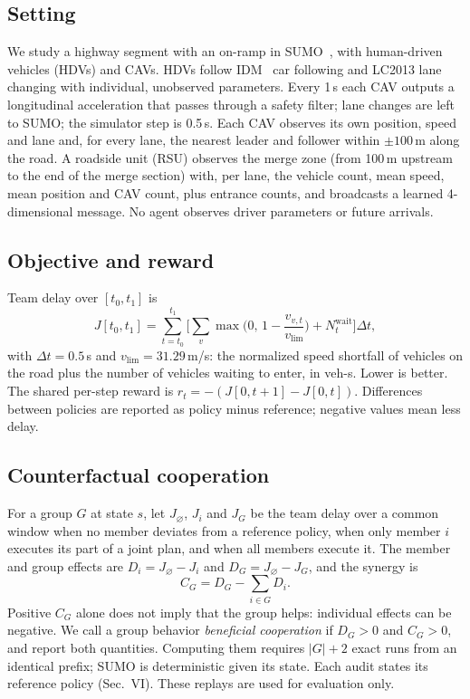 \documentclass[conference]{IEEEtran}
\begin{document}
\subsection{Setting}
We study a highway segment with an on-ramp in SUMO~\cite{lopez_sumo2018}, with human-driven vehicles (HDVs) and CAVs. HDVs follow IDM~\cite{treiber_idm2000} car following and LC2013 lane changing with individual, unobserved parameters. Every 1\,s each CAV outputs a longitudinal acceleration that passes through a safety filter; lane changes are left to SUMO; the simulator step is 0.5\,s. Each CAV observes its own position, speed and lane and, for every lane, the nearest leader and follower within $\pm100$\,m along the road. A roadside unit (RSU) observes the merge zone (from 100\,m upstream to the end of the merge section) with, per lane, the vehicle count, mean speed, mean position and CAV count, plus entrance counts, and broadcasts a learned 4-dimensional message. %
No agent observes driver parameters or future arrivals.

\subsection{Objective and reward}
Team delay over $[t_0,t_1]$ is
\begin{equation}
J[t_0,t_1] = \sum_{t=t_0}^{t_1}\Big[\sum_{v}\max\Big(0,\,1-\frac{v_{v,t}}{v_{\lim}}\Big) + N^{\mathrm{wait}}_t\Big]\Delta t ,
\end{equation}
with $\Delta t=0.5$\,s and $v_{\lim}=31.29$\,m/s: the normalized speed shortfall of vehicles on the road plus the number of vehicles waiting to enter, in veh-s. Lower is better. The shared per-step reward is $r_t = -(J[0,t+1]-J[0,t])$. %
Differences between policies are reported as policy minus reference; negative values mean less delay.

\subsection{Counterfactual cooperation}
For a group $G$ at state $s$, let $J_\varnothing$, $J_i$ and $J_G$ be the team delay over a common window when no member deviates from a reference policy, when only member $i$ executes its part of a joint plan, and when all members execute it. The member and group effects are $D_i = J_\varnothing - J_i$ and $D_G = J_\varnothing - J_G$, and the synergy is
\begin{equation}
C_G = D_G - \sum_{i\in G} D_i .
\end{equation}
Positive $C_G$ alone does not imply that the group helps: individual effects can be negative. We call a group behavior \emph{beneficial cooperation} if $D_G>0$ and $C_G>0$, and report both quantities. Computing them requires $|G|+2$ exact runs from an identical prefix; SUMO is deterministic given its state. Each audit states its reference policy (Sec.~VI). These replays are used for evaluation only.
\end{document}
